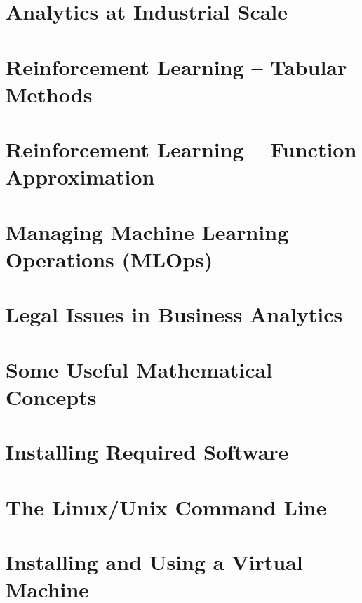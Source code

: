 \documentclass{book}
\begin{document}
\graphicspath{{class20/}}
\chapter{Analytics at Industrial Scale}


\graphicspath{{class21/}}
\chapter{Reinforcement Learning -- Tabular Methods}


{  
\graphicspath{{class22/}}
\chapter{Reinforcement Learning -- Function Approximation}

}

\graphicspath{{class23/}}
\chapter{Managing Machine Learning Operations (MLOps)}


\graphicspath{{class24/}}
\chapter{Legal Issues in Business Analytics}


\appendix

\graphicspath{{math/}}
\chapter{Some Useful Mathematical Concepts}


\begin{withcode}
\graphicspath{{software/}}
\chapter{Installing Required Software}


\graphicspath{{commandline/}}
\chapter{The Linux/Unix Command Line}


\graphicspath{{vm/}}
\chapter{Installing and Using a Virtual Machine}

\end{withcode}

\backmatter

%

\printindex
\end{document}
